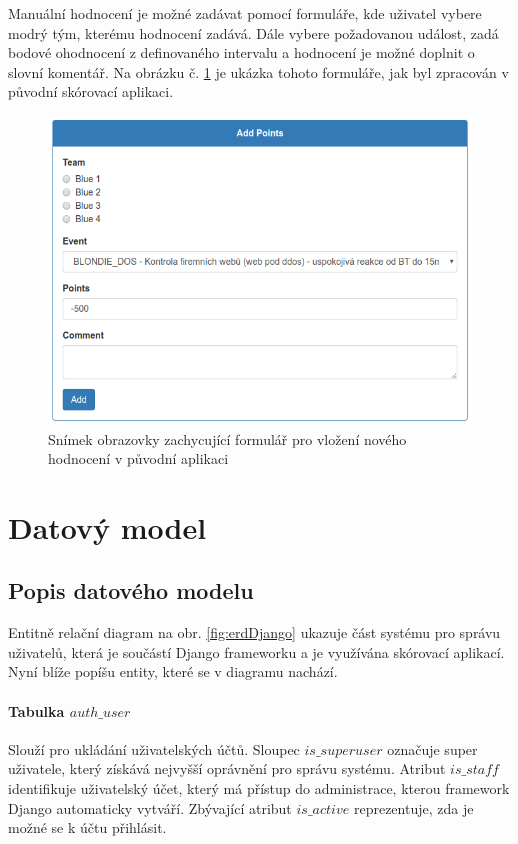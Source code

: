 \documentclass[
  digital,
  twoside,
  table, 
  nolof, 
  nolot
]{fithesis3}
\begin{document}
Manuální hodnocení je možné zadávat pomocí formuláře, kde uživatel vybere modrý tým, kterému hodnocení zadává. Dále vybere požadovanou událost, zadá bodové ohodnocení z definovaného intervalu a hodnocení je možné doplnit o slovní komentář. Na obrázku č. \ref{fig:formScore} je ukázka tohoto formuláře, jak byl zpracován v původní skórovací aplikaci.

\begin{figure}[h!]
    \centering
    \includegraphics[width=12.8cm]{images/form.png}
    \caption{Snímek obrazovky zachycující formulář pro vložení nového hodnocení v původní aplikaci}
    \label{fig:formScore}
\end{figure}

\section{Datový model}
\subsection{Popis datového modelu}

Entitně relační diagram na obr. \ref{fig:erdDjango} ukazuje část systému pro správu uživatelů, která je součástí Django frameworku a je využívána skórovací aplikací. Nyní blíže popíšu entity, které se v diagramu nachází.

\paragraph{Tabulka $auth\_user$} Slouží pro ukládání uživatelských účtů. Sloupec $is\_superuser$ označuje super uživatele, který získává nejvyšší oprávnění pro správu systému. Atribut $is\_staff$ identifikuje uživatelský účet, který má přístup do administrace, kterou framework Django automaticky vytváří. Zbývající atribut $is\_active$ reprezentuje, zda je možné se k účtu přihlásit.
\end{document}
